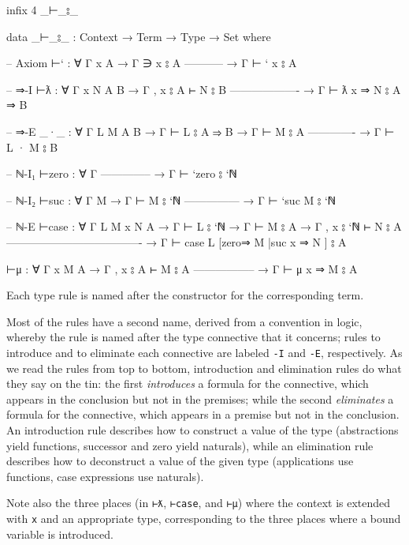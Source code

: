 \begin{fence}
\begin{code}
infix  4  _⊢_⦂_

data _⊢_⦂_ : Context → Term → Type → Set where

  -- Axiom
  ⊢` : ∀ {Γ x A}
    → Γ ∋ x ⦂ A
      -----------
    → Γ ⊢ ` x ⦂ A

  -- ⇒-I
  ⊢ƛ : ∀ {Γ x N A B}
    → Γ , x ⦂ A ⊢ N ⦂ B
      -------------------
    → Γ ⊢ ƛ x ⇒ N ⦂ A ⇒ B

  -- ⇒-E
  _·_ : ∀ {Γ L M A B}
    → Γ ⊢ L ⦂ A ⇒ B
    → Γ ⊢ M ⦂ A
      -------------
    → Γ ⊢ L · M ⦂ B

  -- ℕ-I₁
  ⊢zero : ∀ {Γ}
      --------------
    → Γ ⊢ `zero ⦂ `ℕ

  -- ℕ-I₂
  ⊢suc : ∀ {Γ M}
    → Γ ⊢ M ⦂ `ℕ
      ---------------
    → Γ ⊢ `suc M ⦂ `ℕ

  -- ℕ-E
  ⊢case : ∀ {Γ L M x N A}
    → Γ ⊢ L ⦂ `ℕ
    → Γ ⊢ M ⦂ A
    → Γ , x ⦂ `ℕ ⊢ N ⦂ A
      -------------------------------------
    → Γ ⊢ case L [zero⇒ M |suc x ⇒ N ] ⦂ A

  ⊢μ : ∀ {Γ x M A}
    → Γ , x ⦂ A ⊢ M ⦂ A
      -----------------
    → Γ ⊢ μ x ⇒ M ⦂ A
\end{code}
\end{fence}

Each type rule is named after the constructor for the corresponding
term.

Most of the rules have a second name, derived from a convention in
logic, whereby the rule is named after the type connective that it
concerns; rules to introduce and to eliminate each connective are
labeled \texttt{-I} and \texttt{-E}, respectively. As we read the rules
from top to bottom, introduction and elimination rules do what they say
on the tin: the first \emph{introduces} a formula for the connective,
which appears in the conclusion but not in the premises; while the
second \emph{eliminates} a formula for the connective, which appears in
a premise but not in the conclusion. An introduction rule describes how
to construct a value of the type (abstractions yield functions,
successor and zero yield naturals), while an elimination rule describes
how to deconstruct a value of the given type (applications use
functions, case expressions use naturals).

Note also the three places (in \texttt{⊢ƛ}, \texttt{⊢case}, and
\texttt{⊢μ}) where the context is extended with \texttt{x} and an
appropriate type, corresponding to the three places where a bound
variable is introduced.

